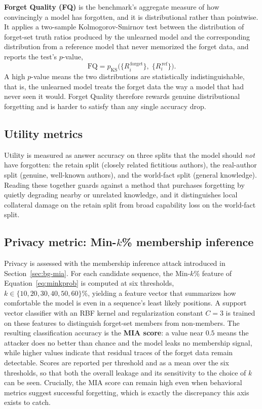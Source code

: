 \documentclass[a4paper,12pt]{report}
\begin{document}
\textbf{Forget Quality (FQ)} is the benchmark's aggregate measure of how convincingly a model has forgotten, and it is distributional rather than pointwise. It applies a two-sample Kolmogorov-Smirnov test between the distribution of forget-set truth ratios produced by the unlearned model and the corresponding distribution from a reference model that never memorized the forget data, and reports the test's $p$-value,
\begin{equation}
	\mathrm{FQ} = p_{\mathrm{KS}}\Big(\big\{R_i^{\,\mathrm{forget}}\big\},\; \big\{R_i^{\,\mathrm{ref}}\big\}\Big).
	\label{eq:fq}
\end{equation}
A high $p$-value means the two distributions are statistically indistinguishable, that is, the unlearned model treats the forget data the way a model that had never seen it would. Forget Quality therefore rewards genuine distributional forgetting and is harder to satisfy than any single accuracy drop.

\subsection{Utility metrics}
Utility is measured as answer accuracy on three splits that the model should \emph{not} have forgotten: the retain split (closely related fictitious authors), the real-author split (genuine, well-known authors), and the world-fact split (general knowledge). Reading these together guards against a method that purchases forgetting by quietly degrading nearby or unrelated knowledge, and it distinguishes local collateral damage on the retain split from broad capability loss on the world-fact split.

\subsection{Privacy metric: Min-$k$\% membership inference}
Privacy is assessed with the membership inference attack introduced in Section~\ref{sec:bg-mia}. For each candidate sequence, the Min-$k$\% feature of Equation~\eqref{eq:minkprob} is computed at six thresholds, $k \in \{10, 20, 30, 40, 50, 60\}\%$, yielding a feature vector that summarizes how comfortable the model is even in a sequence's least likely positions. A support vector classifier with an RBF kernel and regularization constant $C = 3$ is trained on these features to distinguish forget-set members from non-members. The resulting classification accuracy is the \textbf{MIA score}: a value near $0.5$ means the attacker does no better than chance and the model leaks no membership signal, while higher values indicate that residual traces of the forget data remain detectable. Scores are reported per threshold and as a mean over the six thresholds, so that both the overall leakage and its sensitivity to the choice of $k$ can be seen. Crucially, the MIA score can remain high even when behavioral metrics suggest successful forgetting, which is exactly the discrepancy this axis exists to catch.
\end{document}
